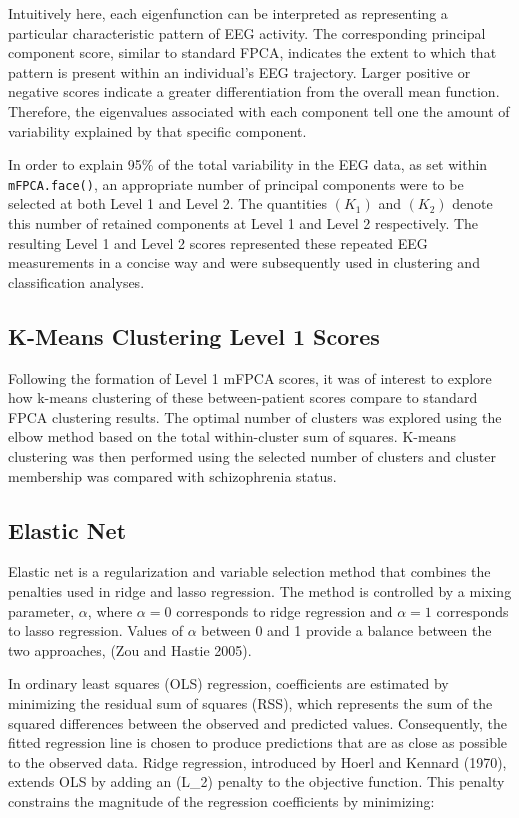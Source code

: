 \documentclass{article}
\begin{document}
Intuitively here, each eigenfunction can be interpreted as representing
a particular characteristic pattern of EEG activity. The corresponding
principal component score, similar to standard FPCA, indicates the
extent to which that pattern is present within an individual's EEG
trajectory. Larger positive or negative scores indicate a greater
differentiation from the overall mean function. Therefore, the
eigenvalues associated with each component tell one the amount of
variability explained by that specific component.

In order to explain 95\% of the total variability in the EEG data, as
set within \texttt{mFPCA.face()}, an appropriate number of principal
components were to be selected at both Level 1 and Level 2. The
quantities \((K_1)\) and \((K_2)\) denote this number of retained
components at Level 1 and Level 2 respectively. The resulting Level 1
and Level 2 scores represented these repeated EEG measurements in a
concise way and were subsequently used in clustering and classification
analyses.

\subsection{K-Means Clustering Level 1
Scores}\label{k-means-clustering-level-1-scores}

Following the formation of Level 1 mFPCA scores, it was of interest to
explore how k-means clustering of these between-patient scores compare
to standard FPCA clustering results. The optimal number of clusters was
explored using the elbow method based on the total within-cluster sum of
squares. K-means clustering was then performed using the selected number
of clusters and cluster membership was compared with schizophrenia
status.

\subsection{Elastic Net}\label{elastic-net}

Elastic net is a regularization and variable selection method that
combines the penalties used in ridge and lasso regression. The method is
controlled by a mixing parameter, \(\alpha\), where \(\alpha = 0\)
corresponds to ridge regression and \(\alpha = 1\) corresponds to lasso
regression. Values of \(\alpha\) between 0 and 1 provide a balance
between the two approaches, (Zou and Hastie 2005).

In ordinary least squares (OLS) regression, coefficients are estimated
by minimizing the residual sum of squares (RSS), which represents the
sum of the squared differences between the observed and predicted
values. Consequently, the fitted regression line is chosen to produce
predictions that are as close as possible to the observed data. Ridge
regression, introduced by Hoerl and Kennard (1970), extends OLS by
adding an (L\_2) penalty to the objective function. This penalty
constrains the magnitude of the regression coefficients by minimizing:
\end{document}

